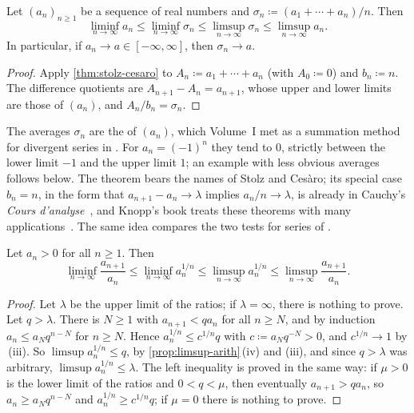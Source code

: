 \begin{corollary}
\label{cor:cesaro}
Let $(a_n)_{n\ge1}$ be a sequence of real numbers and $\sigma_n\coloneqq(a_1+\cdots+a_n)/n$. Then
\[
\liminf_{n\to\infty}a_n\le\liminf_{n\to\infty}\sigma_n\le\limsup_{n\to\infty}\sigma_n\le\limsup_{n\to\infty}a_n .
\]
In particular, if $a_n\to a\in[-\infty,\infty]$, then $\sigma_n\to a$.
\end{corollary}

\begin{proof}
Apply \cref{thm:stolz-cesaro} to $A_n\coloneqq a_1+\cdots+a_n$ (with $A_0\coloneqq0$) and $b_n\coloneqq n$. The difference quotients are $A_{n+1}-A_n=a_{n+1}$, whose upper and lower limits are those of $(a_n)$, and $A_n/b_n=\sigma_n$.
\end{proof}

The averages $\sigma_n$ are the  of $(a_n)$, which Volume~I met as a summation method for divergent series in . For $a_n=(-1)^n$ they tend to $0$, strictly between the lower limit $-1$ and the upper limit $1$; an example with less obvious averages follows below. The theorem bears the names of Stolz and Ces\`aro; its special case $b_n=n$, in the form that $a_{n+1}-a_n\to\lambda$ implies $a_n/n\to\lambda$, is already in Cauchy's \emph{Cours d'analyse}~\cite{cauchy1821}, and Knopp's book treats these theorems with many applications~\cite{knopp1990}. The same idea compares the two tests for series of .

\begin{theorem}
\label{thm:ratio-root}
Let $a_n>0$ for all $n\ge1$. Then
\[
\liminf_{n\to\infty}\frac{a_{n+1}}{a_n}\le\liminf_{n\to\infty}a_n^{1/n}\le\limsup_{n\to\infty}a_n^{1/n}\le\limsup_{n\to\infty}\frac{a_{n+1}}{a_n} .
\]
\end{theorem}

\begin{proof}
Let $\lambda$ be the upper limit of the ratios; if $\lambda=\infty$, there is nothing to prove. Let $q>\lambda$. There is $N\ge1$ with $a_{n+1}<qa_n$ for all $n\ge N$, and by induction $a_n\le a_Nq^{n-N}$ for $n\ge N$. Hence $a_n^{1/n}\le c^{1/n}q$ with $c\coloneqq a_Nq^{-N}>0$, and $c^{1/n}\to1$ by \,(iii). So $\limsup a_n^{1/n}\le q$, by \cref{prop:limsup-arith}\,(iv) and (iii), and since $q>\lambda$ was arbitrary, $\limsup a_n^{1/n}\le\lambda$. The left inequality is proved in the same way: if $\mu>0$ is the lower limit of the ratios and $0<q<\mu$, then eventually $a_{n+1}>qa_n$, so $a_n\ge a_Nq^{n-N}$ and $a_n^{1/n}\ge c^{1/n}q$; if $\mu=0$ there is nothing to prove.
\end{proof}


